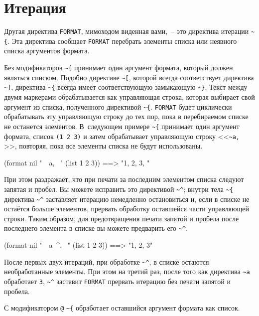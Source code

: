 \section{Итерация}

Другая директива \lstinline{FORMAT}, мимоходом виденная вами,~-- это директива итерации
\lstinline!~{!. Эта директива сообщает \lstinline{FORMAT} перебрать элементы списка или
  неявного списка аргументов формата.

Без модификаторов \lstinline!~{! принимает один аргумент формата, который должен являться списком. Подобно директиве
\lstinline!~[!, которой всегда соответствует директива \lstinline!~]!, директива \lstinline!~{! всегда имеет соответствующую замыкающую
\lstinline!~}!. Текст между двумя маркерами обрабатывается как управляющая строка, которая выбирает свой аргумент из
списка, полученного  директивой \lstinline!~{!. \lstinline{FORMAT} будет циклически обрабатывать эту
управляющую строку до тех пор, пока в перебираемом списке не останется элементов. В~следующем примере \lstinline!~{!
принимает один аргумент формата, список \lstinline{(1 2 3)} и затем обрабатывает управляющую строку <<\lstinline!~a, !>>, повторяя,
пока все элементы списка не будут использованы.

\begin{myverb}
(format nil "~{~a, ~}" (list 1 2 3)) ==> "1, 2, 3, "
\end{myverb}

При этом раздражает, что при печати за последним элементом списка следуют запятая и пробел. Вы можете исправить
это директивой \lstinline!~^!; внутри тела \lstinline!~{! директива \lstinline!~^! заставляет итерацию немедленно остановиться и, если в
списке не остаётся больше элементов, прервать обработку оставшейся части управляющей строки. Таким образом, для
предотвращения печати запятой и пробела после последнего элемента в списке вы можете предварить его \lstinline!~^!.

\begin{myverb}
(format nil "~{~a~^, ~}" (list 1 2 3)) ==> "1, 2, 3"
\end{myverb}

После первых двух итераций, при обработке \lstinline!~^!, в списке остаются необработанные
элементы. При этом на третий раз, после того как директива \lstinline!~a! обработает
\lstinline{3}, \lstinline!~^! заставит \lstinline{FORMAT} прервать итерацию без печати запятой и
пробела.

С модификатором \lstinline!@! \lstinline!~{! обработает оставшийся аргумент формата как список.

